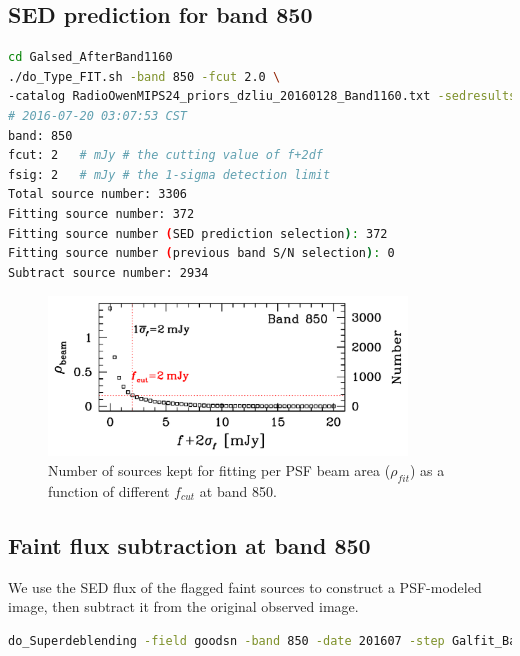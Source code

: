 \documentclass[11pt,a4paper]{article}
\begin{document}
\subsection{SED prediction for band 850}
\label{Band850_Galpre}

\begin{lstlisting}[language=bash]
cd Galsed_AfterBand1160
./do_Type_FIT.sh -band 850 -fcut 2.0 \
-catalog RadioOwenMIPS24_priors_dzliu_20160128_Band1160.txt -sedresults ResLMT*.txt
# 2016-07-20 03:07:53 CST
band: 850
fcut: 2   # mJy # the cutting value of f+2df
fsig: 2   # mJy # the 1-sigma detection limit
Total source number: 3306
Fitting source number: 372
Fitting source number (SED prediction selection): 372
Fitting source number (previous band S/N selection): 0
Subtract source number: 2934
\end{lstlisting}

\begin{figure}[H]
	\caption{Number of sources kept for fitting per PSF beam area ($\rho_{fit}$) as a function of different $f_{cut}$ at band 850.}
	\includegraphics[width=0.85\textwidth]{plot_cutting_flux_850}
\end{figure}

\subsection{Faint flux subtraction at band 850}
\label{Band850_Galsub}

We use the SED flux of the flagged faint sources to construct a PSF-modeled image, then subtract it from the original observed image. 

\begin{lstlisting}[language=bash]
do_Superdeblending -field goodsn -band 850 -date 201607 -step Galfit_Band850 -catalog-input Galsed_AfterBand1160/RadioOwenMIPS24_priors_dzliu_20160128_Band1160.txt -sedpredict Galsed_AfterBand1160/do_Type_FIT/SED_predictions_850.txt -fitsname S2CLS_GOODS-N_MF_FLUX_DR1 -fitsname-rms S2CLS_GOODS-N_MF_RMS_DR1 -fitsname-psf S2CLS_SCUBA2_850um_dzliu_DoubleGaussian_PSF
\end{lstlisting}
\end{document}
